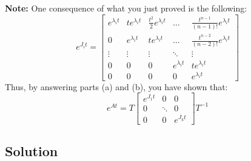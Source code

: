 \documentclass[11pt]{report}
\theoremstyle{definition}
\begin{document}
\begin{enumerate}[label = \alph*)]
\justify
{\bf Note: }
One consequence of what you just proved is the following:
\[
e^{J_i t} =
\begin{bmatrix}
e^{\lambda_i t} & t e^{\lambda_i t} & \frac{t^2}{2}e^{\lambda_i t} & \dots & \frac{t^{n-1}}{(n-1)!} e^{\lambda_i t} \\
0 & e^{\lambda_i t} & t e^{\lambda_i t} & \dots & \frac{t^{n-2}}{(n-2)!} e^{\lambda_i t} \\
\vdots & \vdots & \vdots & \ddots & \vdots \\
0 & 0 & 0 & e^{\lambda_i t} & t e^{\lambda_i t} \\
0 & 0 & 0 & 0 & e^{\lambda_i t}
\end{bmatrix}
\]
Thus, by answering parts (a) and (b), you have shown that:
\[
e^{At} =
T
\begin{bmatrix}
e^{J_1 t} & 0 & 0 \\
0 & \ddots & 0 \\
0 & 0 & e^{J_k t}
\end{bmatrix}
T^{-1}
\]
\end{enumerate}

\subsection*{Solution}
\end{document}
